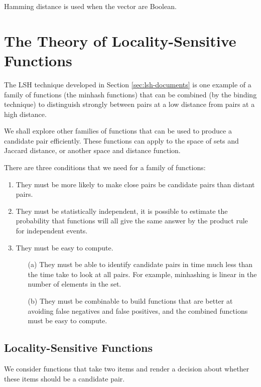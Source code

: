 Hamming distance is used when the vector are Boolean. 

\section{The Theory of Locality-Sensitive Functions}\label{sec:the-theory-of-locality-sensitive-functions}

The LSH technique developed in Section \ref{sec:lsh-documents} is one example of a family of functions (the minhash functions) that can be combined (by the binding technique) to distinguish strongly between pairs at a low distance from pairs at a high distance.

We shall explore other families of functions that can be used to produce a candidate pair efficiently. These functions can apply to the space of sets and Jaccard distance, or another space and distance function. 

There are three conditions that we need for a family of functions:

\begin{enumerate}
    \item They must be more likely to make close pairs be candidate pairs than distant pairs.
    \item They must be statistically independent, it is possible to estimate the probability that functions will all give the same answer by the product rule for independent events.
    \item They must be easy to compute.
        \begin{itemize}
            \item[(a)] They must be able to identify candidate pairs in time much less than the time take to look at all pairs. For example, minhashing is linear in the number of elements in the set.
            \item[(b)] They must be combinable to build functions that are better at avoiding false negatives and false positives, and the combined functions must be easy to compute.
        \end{itemize}
\end{enumerate}

\subsection{Locality-Sensitive Functions}\label{subsec:locality-sensitive-functions}

We consider functions that take two items and render a decision about whether these items should be a candidate pair. 

